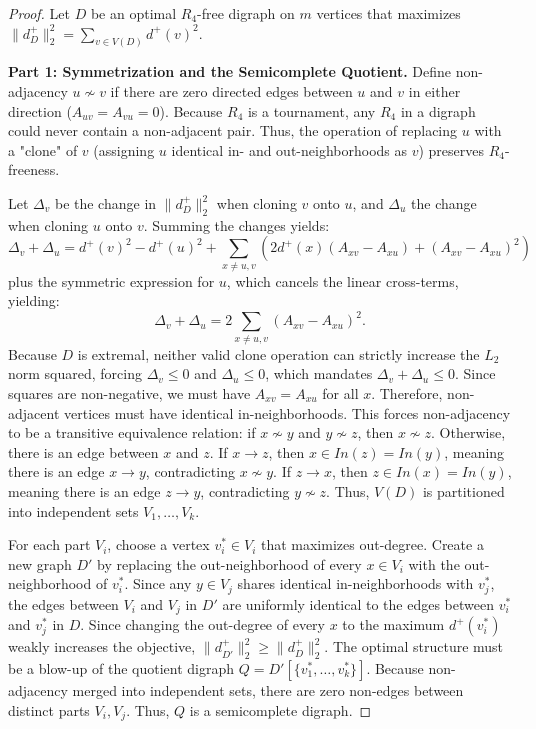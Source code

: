 \documentclass[a4paper]{amsart}
\begin{document}
\begin{proof}
    Let $D$ be an optimal $R_4$-free digraph on $m$ vertices that maximizes $\|d^+_D\|_2^2 = \sum_{v \in V(D)} d^+(v)^2$.

    \textbf{Part 1: Symmetrization and the Semicomplete Quotient.}
    Define non-adjacency $u \not\sim v$ if there are zero directed edges between $u$ and $v$ in either direction ($A_{uv} = A_{vu} = 0$). Because $R_4$ is a tournament, any $R_4$ in a digraph could never contain a non-adjacent pair. Thus, the operation of replacing $u$ with a "clone" of $v$ (assigning $u$ identical in- and out-neighborhoods as $v$) preserves $R_4$-freeness.
    
    Let $\Delta_v$ be the change in $\|d^+_D\|_2^2$ when cloning $v$ onto $u$, and $\Delta_u$ the change when cloning $u$ onto $v$. Summing the changes yields:
    \[ \Delta_v + \Delta_u = d^+(v)^2 - d^+(u)^2 + \sum_{x \neq u,v} \left(2d^+(x)(A_{xv} - A_{xu}) + (A_{xv} - A_{xu})^2\right) \]
    plus the symmetric expression for $u$, which cancels the linear cross-terms, yielding:
    \[ \Delta_v + \Delta_u = 2 \sum_{x \neq u, v} (A_{xv} - A_{xu})^2. \]
    Because $D$ is extremal, neither valid clone operation can strictly increase the $L_2$ norm squared, forcing $\Delta_v \le 0$ and $\Delta_u \le 0$, which mandates $\Delta_v + \Delta_u \le 0$. Since squares are non-negative, we must have $A_{xv} = A_{xu}$ for all $x$. Therefore, non-adjacent vertices must have identical in-neighborhoods. This forces non-adjacency to be a transitive equivalence relation: if $x \not\sim y$ and $y \not\sim z$, then $x \not\sim z$. Otherwise, there is an edge between $x$ and $z$. If $x \to z$, then $x \in In(z) = In(y)$, meaning there is an edge $x \to y$, contradicting $x \not\sim y$. If $z \to x$, then $z \in In(x) = In(y)$, meaning there is an edge $z \to y$, contradicting $y \not\sim z$. Thus, $V(D)$ is partitioned into independent sets $V_1, \dots, V_k$.

    For each part $V_i$, choose a vertex $v_i^* \in V_i$ that maximizes out-degree. Create a new graph $D'$ by replacing the out-neighborhood of every $x \in V_i$ with the out-neighborhood of $v_i^*$. Since any $y \in V_j$ shares identical in-neighborhoods with $v_j^*$, the edges between $V_i$ and $V_j$ in $D'$ are uniformly identical to the edges between $v_i^*$ and $v_j^*$ in $D$. Since changing the out-degree of every $x$ to the maximum $d^+(v_i^*)$ weakly increases the objective, $\|d^+_{D'}\|_2^2 \ge \|d^+_D\|_2^2$. The optimal structure must be a blow-up of the quotient digraph $Q = D'[\{v_1^*, \dots, v_k^*\}]$. Because non-adjacency merged into independent sets, there are zero non-edges between distinct parts $V_i, V_j$. Thus, $Q$ is a semicomplete digraph.


\end{proof}
\end{document}
